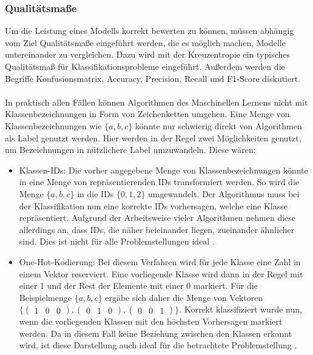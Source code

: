 \documentclass[11pt,bibliography=totocnumbered]{scrartcl}
\begin{document}
\subsubsection{Qualitätsmaße}
Um die Leistung eines Modells korrekt bewerten zu können, müssen abhängig vom Ziel Qualitätsmaße eingeführt werden, die es möglich machen, Modelle untereinander zu vergleichen. Dazu wird mit der Kreuzentropie ein typisches Qualitätsmaß für Klassifikationsprobleme eingeführt. Außerdem werden die Begriffe Konfusionsmatrix, Accuracy, Precision, Recall und F1-Score diskutiert.
\\\\
In praktisch allen Fällen können Algorithmen des Maschinellen Lernens nicht mit Klassenbezeichnungen in Form von Zeichenketten umgehen. Eine Menge von Klassenbezeichnungen wie \ensuremath{\{a, b, c \}} könnte nur schwierig direkt von Algorithmen als Label genutzt werden. Hier werden in der Regel zwei Möglichkeiten genutzt, um Bezeichnungen in nützlichere Label umzuwandeln. Diese wären:
\begin{itemize}
	\item Klassen-IDs: Die vorher angegebene Menge von Klassenbezeichnungen könnte in eine Menge von repräsentierenden IDs transformiert werden. So wird die Menge \ensuremath{\{a, b, c \}} in die IDs \ensuremath{\{0, 1, 2 \}} umgewandelt. Der Algorithmus muss bei der Klassifikation nun eine korrekte IDs vorhersagen, welche eine Klasse repräsentiert. Aufgrund der Arbeitsweise vieler Algorithmen nehmen diese allerdings an, dass IDs, die näher beieinander liegen, zueinander ähnlicher sind. Dies ist nicht für alle Problemstellungen ideal \cite[S.12]{BA}\cite[S.63]{MACHINE_LEARNING}.
	\item One-Hot-Kodierung: Bei diesem Verfahren wird für jede Klasse eine Zahl in einem Vektor reserviert. Eine vorliegende Klasse wird dann in der Regel mit einer 1 und der Rest der Elemente mit einer 0 markiert. Für die Beispielmenge \ensuremath{\{a, b, c \}} ergäbe sich daher die Menge von Vektoren \ensuremath{\{\left(\begin{smallmatrix}1 & 0 & 0\end{smallmatrix}\right), \left(\begin{smallmatrix}0 & 1 & 0\end{smallmatrix}\right), \left(\begin{smallmatrix}0 & 0 & 1\end{smallmatrix}\right)\}}. Korrekt klassifiziert wurde nun, wenn die vorliegenden Klassen mit den höchsten Vorhersagen markiert werden. Da in diesem Fall keine Beziehung zwischen den Klassen erkannt wird, ist diese Darstellung auch ideal für die betrachtete Problemstellung \cite[S.12]{BA}\cite[S.63]{MACHINE_LEARNING}.
\end{itemize}
\end{document}
